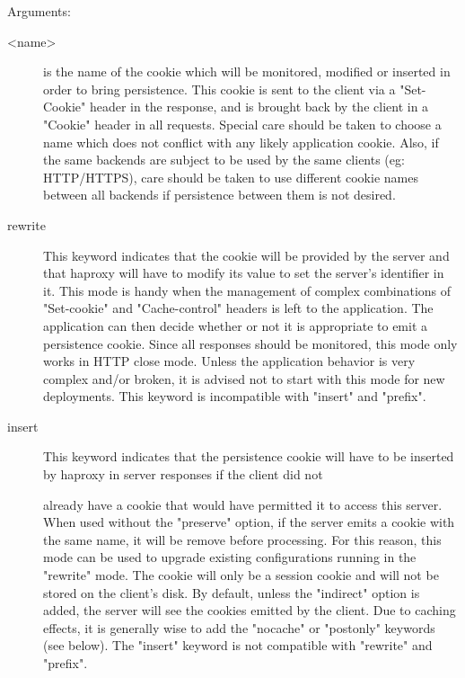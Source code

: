   
  Arguments:
  \begin{description}
  \item[<name>]
              is the name of the cookie which will be monitored, modified or
              inserted in order to bring persistence. This cookie is sent to
              the client via a "Set-Cookie" header in the response, and is
              brought back by the client in a "Cookie" header in all requests.
              Special care should be taken to choose a name which does not
              conflict with any likely application cookie. Also, if the same
              backends are subject to be used by the same clients (eg:
              HTTP/HTTPS), care should be taken to use different cookie names
              between all backends if persistence between them is not desired.

  \item[rewrite]
              This keyword indicates that the cookie will be provided by the
              server and that haproxy will have to modify its value to set the
              server's identifier in it. This mode is handy when the management
              of complex combinations of "Set-cookie" and "Cache-control"
              headers is left to the application. The application can then
              decide whether or not it is appropriate to emit a persistence
              cookie. Since all responses should be monitored, this mode only
              works in HTTP close mode. Unless the application behavior is
              very complex and/or broken, it is advised not to start with this
              mode for new deployments. This keyword is incompatible with
              "insert" and "prefix".

  \item[insert]
              This keyword indicates that the persistence cookie will have to
              be inserted by haproxy in server responses if the client did not

              already have a cookie that would have permitted it to access this
              server. When used without the "preserve" option, if the server
              emits a cookie with the same name, it will be remove before
              processing.  For this reason, this mode can be used to upgrade
              existing configurations running in the "rewrite" mode. The cookie
              will only be a session cookie and will not be stored on the
              client's disk. By default, unless the "indirect" option is added,
              the server will see the cookies emitted by the client. Due to
              caching effects, it is generally wise to add the "nocache" or
              "postonly" keywords (see below). The "insert" keyword is not
              compatible with "rewrite" and "prefix".


\end{description}
